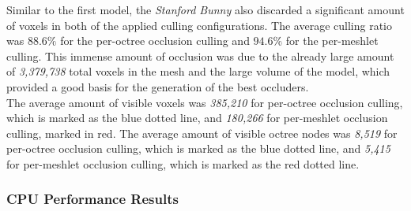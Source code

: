 \noindent
Similar to the first model, the \emph{Stanford Bunny} also discarded a significant amount of 
voxels in both of the applied culling configurations. The average culling ratio was $88.6\%$ 
for the per-octree occlusion culling and $94.6\%$ for the per-meshlet culling. This immense 
amount of occlusion was due to the already large amount of \emph{3,379,738} total voxels in the 
mesh and the large volume of the model, which provided a good basis for the generation of the 
best occluders. \\


\noindent
The average amount of visible voxels was \emph{385,210} for per-octree occlusion culling, which is 
marked as the blue dotted line, and \emph{180,266} for per-meshlet occlusion culling, marked in red.
The average amount of visible octree nodes was \emph{8,519} for per-octree occlusion culling, which 
is marked as the blue dotted line, and \emph{5,415} for per-meshlet occlusion culling, which is marked
as the red dotted line.

\subsubsection*{CPU Performance Results} \label{subsubsec-cpu-performance-results-bunny}

